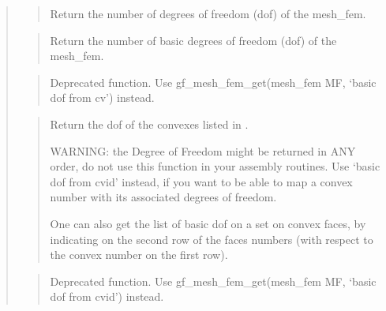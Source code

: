 \documentclass[a4paper,11pt,english]{sphinxmanual}
\begin{document}
\begin{quote}

\begin{quote}

Return the number of degrees of freedom (dof) of the mesh\_fem.
\end{quote}

\begin{quote}

Return the number of basic degrees of freedom (dof) of the mesh\_fem.
\end{quote}

\begin{quote}

Deprecated function. Use gf\_mesh\_fem\_get(mesh\_fem MF, ‘basic dof from cv’) instead.
\end{quote}

\begin{quote}

Return the dof of the convexes listed in .

WARNING: the Degree of Freedom might be returned in ANY order, do
not use this function in your assembly routines. Use ‘basic dof from cvid’
instead, if you want to be able to map a convex number with its
associated degrees of freedom.

One can also get the list of basic dof on a set on convex faces, by
indicating on the second row of  the faces numbers (with
respect to the convex number on the first row).
\end{quote}

\begin{quote}

Deprecated function. Use gf\_mesh\_fem\_get(mesh\_fem MF, ‘basic dof from cvid’) instead.
\end{quote}

\begin{quote}


\end{quote}
\end{quote}
\end{document}

